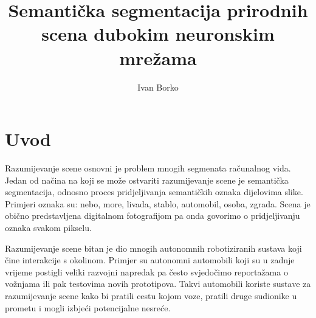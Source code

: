 \documentclass[times, utf8, diplomski, numeric]{fer}
\begin{document}

\title{Semantička segmentacija prirodnih scena dubokim neuronskim mrežama}

\author{Ivan Borko}

\maketitle




\tableofcontents

\chapter{Uvod}

Razumijevanje scene osnovni je problem mnogih segmenata računalnog vida. Jedan od načina na koji se može ostvariti razumijevanje scene je semantička segmentacija, odnosno proces pridjeljivanja semantičkih oznaka dijelovima slike. Primjeri oznaka su: nebo, more, livada, stablo, automobil, osoba, zgrada. Scena je obično predstavljena digitalnom fotografijom pa onda govorimo o pridjeljivanju oznaka svakom pikselu.

Razumijevanje scene bitan je dio mnogih autonomnih robotiziranih sustava koji čine interakcije s okolinom.
Primjer su autonomni automobili koji su u zadnje vrijeme postigli veliki razvojni napredak pa često svjedočimo reportažama o vožnjama ili pak testovima novih prototipova. Takvi automobili koriste sustave za razumijevanje scene kako bi pratili cestu kojom voze, pratili druge sudionike u prometu i mogli izbjeći potencijalne nesreće.
\end{document}
